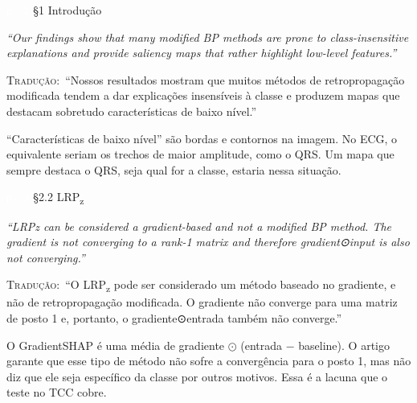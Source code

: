 \documentclass[11pt,a4paper]{article}
\newcommand{\pagechip}[1]{{\setlength{\fboxsep}{1.5pt}\colorbox{cAcc}{\textcolor{white}{\scriptsize\texttt{#1}}}}}
\newenvironment{origquote}{\par\itshape\small}{\par}
\newenvironment{tradquote}{\par\small\textsc{Tradução:}\ }{\par}
\newcommand{\explab}[1]{\par\smallskip{\small\color{cAcc}\textbf{\MakeUppercase{#1}}}\par}
\begin{document}
\begin{citacard}{\pagechip{p. 2} §1 Introdução}
\begin{origquote}“Our findings show that many modified BP methods are prone to class-insensitive explanations and provide saliency maps that rather highlight low-level features.”\end{origquote}
\begin{tradquote}“Nossos resultados mostram que muitos métodos de retropropagação modificada tendem a dar explicações insensíveis à classe e produzem mapas que destacam sobretudo características de baixo nível.”\end{tradquote}
\explab{Explicação}
“Características de baixo nível” são bordas e contornos na imagem. No ECG, o equivalente seriam os trechos de maior amplitude, como o QRS. Um mapa que sempre destaca o QRS, seja qual for a classe, estaria nessa situação.
\end{citacard}

\begin{citacard}{\pagechip{p. 3} §2.2 LRP\textsubscript{z}}
\begin{origquote}“LRPz can be considered a gradient-based and not a modified BP method. The gradient is not converging to a rank-1 matrix and therefore gradient⊙input is also not converging.”\end{origquote}
\begin{tradquote}“O LRP\textsubscript{z} pode ser considerado um método baseado no gradiente, e não de retropropagação modificada. O gradiente não converge para uma matriz de posto 1 e, portanto, o gradiente⊙entrada também não converge.”\end{tradquote}
\explab{Explicação}
O GradientSHAP é uma média de gradiente $\odot$ (entrada $-$ baseline). O artigo garante que esse tipo de método não sofre a convergência para o posto 1, mas não diz que ele seja específico da classe por outros motivos. Essa é a lacuna que o teste no TCC cobre.
\end{citacard}
\end{document}
